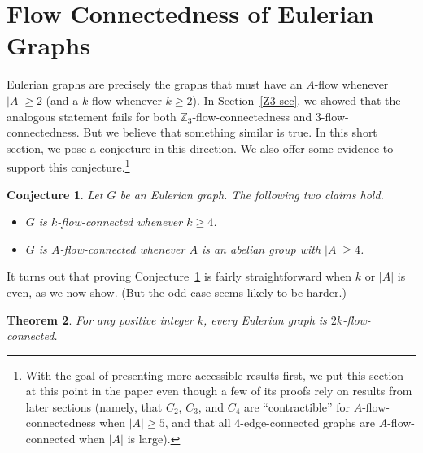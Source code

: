 \documentclass[a4paper,12pt]{article}
\theoremstyle{plain}
\newtheorem{theorem}{Theorem}[section]
\newtheorem{conj}[theorem]{Conjecture}
\theoremstyle{definition}
\renewcommand\ge\geqslant
\begin{document}
\section{Flow Connectedness of Eulerian Graphs}\label{sec:Eulerian}

Eulerian graphs are precisely the graphs that must have an $A$-flow whenever $|A|\ge 2$ (and a $k$-flow whenever $k\ge 2$). In Section~\ref{Z3-sec}, we showed that the analogous statement fails for both $\mathbb{Z}_3$-flow-connectedness and $3$-flow-connectedness. But we believe that something similar is true.  In this short section, we pose a conjecture in this direction. We also offer some evidence to support this conjecture.\footnote{With the goal of presenting more accessible results first, we put this section at this point in the paper even though a few of its proofs rely on results from later sections (namely, that $C_2$, $C_3$, and $C_4$ are ``contractible'' for $A$-flow-connectedness when $|A|\ge 5$, and that all $4$-edge-connected graphs are $A$-flow-connected when $|A|$ is large).}

\begin{conj}\label{eulerian-conj}
Let $G$ be an Eulerian graph. The following two claims hold.
    \begin{itemize}
        \item $G$ is $k$-flow-connected 
    whenever $k\ge 4$.
        \item $G$ is $A$-flow-connected 
    whenever $A$ is an abelian group with $|A|\ge 4$.
    \end{itemize}
\end{conj}

It turns out that proving Conjecture~\ref{eulerian-conj} is fairly straightforward when $k$ or $|A|$ is even, as we now show. (But the odd case seems likely to be harder.)

\begin{theorem}\label{thm:Eulerian 2k-flow-connetced}
    For any positive integer $k$, every Eulerian graph is $2k$-flow-connected.
\end{theorem}
\end{document}
